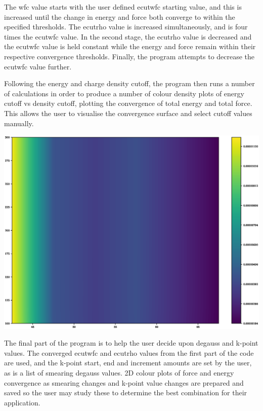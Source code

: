 The wfc value starts with the user defined ecutwfc starting value, and this is increased until the change in energy and force both converge to within the specified thresholds.  The ecutrho value is increased simultaneously, and is four times the ecutwfc value.  In the second stage, the ecutrho value is decreased and the ecutwfc value is held constant while the energy and force remain within their respective convergence thresholds.  Finally, the program attempts to decrease the ecutwfc value further.

Following the energy and charge density cutoff, the program then runs a number of calculations in order to produce a number of colour density plots of energy cutoff vs density cutoff, plotting the convergence of total energy and total force.  This allows the user to visualise the convergence surface and select cutoff values manually.

\begin{center}
\includegraphics[scale=0.35]{chapters/methodology_interatomic_potentials/qeconverge/ecut2d_energy_wfcconv_ry_colour}
\end{center}

The final part of the program is to help the user decide upon degauss and k-point values.  The converged ecutwfc and ecutrho values from the first part of the code are used, and the k-point start, end and increment amounts are set by the user, as is a list of smearing degauss values.  2D colour plots of force and energy convergence as smearing changes and k-point value changes are prepared and saved so the user may study these to determine the best combination for their application.

